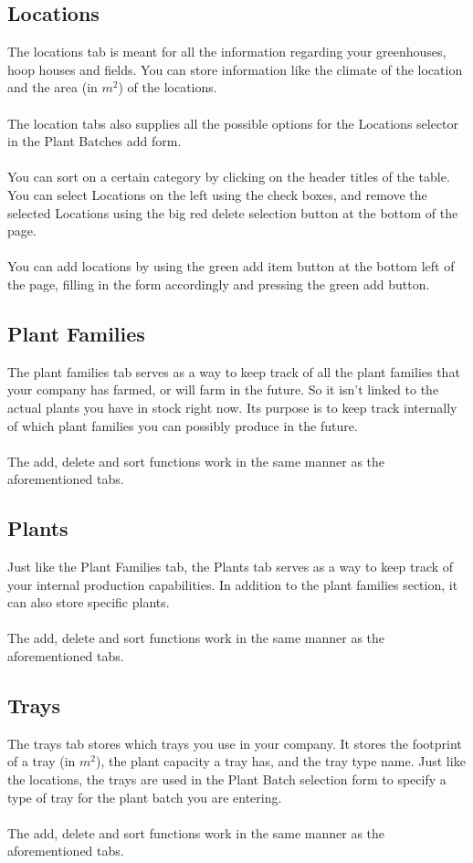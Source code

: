 \documentclass{article}
\begin{document}
\subsection{Locations}
The locations tab is meant for all the information regarding your greenhouses, hoop houses and fields. You can store information like the climate of the location and the area (in $m^2$) of the locations.\\\\
The location tabs also supplies all the possible options for the Locations selector in the Plant Batches add form.\\\\
You can sort on a certain category by clicking on the header titles of the table.\\ You can select Locations on the left using the check boxes, and remove the selected Locations using the big red delete selection button at the bottom of the page.\\\\
You can add locations by using the green add item button at the bottom left of the page, filling in the form accordingly and pressing the green add button.

\subsection{Plant Families}
The plant families tab serves as a way to keep track of all the plant families that your company has farmed, or will farm in the future. So it isn't linked to the actual plants you have in stock right now. Its purpose is to keep track internally of which plant families you can possibly produce in the future.\\\\
The add, delete and sort functions work in the same manner as the aforementioned tabs.

\subsection{Plants}
Just like the Plant Families tab, the Plants tab serves as a way to keep track of your internal production capabilities. In addition to the plant families section, it can also store specific plants.\\\\
The add, delete and sort functions work in the same manner as the aforementioned tabs.

\subsection{Trays}
The trays tab stores which trays you use in your company. It stores the footprint of a tray (in $m^2$), the plant capacity a tray has, and the tray type name. Just like the locations, the trays are used in the Plant Batch selection form to specify a type of tray for the plant batch you are entering.\\\\
The add, delete and sort functions work in the same manner as the aforementioned tabs.
\end{document}
